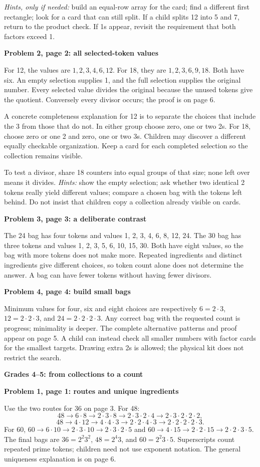 \documentclass[11pt]{article}
\newcommand{\head}[1]{\par\textbf{\large #1}\par}
\newcommand{\sub}[1]{\par\textbf{#1}\par}
\begin{document}
\emph{Hints, only if needed:} build an equal-row array for the card; find a different first rectangle; look for a card that can still split. If a child splits 12 into 5 and 7, return to the product check. If 1s appear, revisit the requirement that both factors exceed 1.

\sub{Problem 2, page 2: all selected-token values}
For 12, the values are $1,2,3,4,6,12$. For 18, they are $1,2,3,6,9,18$. Both have six. An empty selection supplies 1, and the full selection supplies the original number. Every selected value divides the original because the unused tokens give the quotient. Conversely every divisor occurs; the proof is on page 6.

A concrete completeness explanation for 12 is to separate the choices that include the 3 from those that do not. In either group choose zero, one or two 2s. For 18, choose zero or one 2 and zero, one or two 3s. Children may discover a different equally checkable organization. Keep a card for each completed selection so the collection remains visible.

To test a divisor, share 18 counters into equal groups of that size; none left over means it divides. \emph{Hints:} show the empty selection; ask whether two identical 2 tokens really yield different values; compare a chosen bag with the tokens left behind. Do not insist that children copy a collection already visible on cards.

\sub{Problem 3, page 3: a deliberate contrast}
The 24 bag has four tokens and values 1, 2, 3, 4, 6, 8, 12, 24. The 30 bag has three tokens and values 1, 2, 3, 5, 6, 10, 15, 30. Both have eight values, so the bag with more tokens does not make more. Repeated ingredients and distinct ingredients give different choices, so token count alone does not determine the answer. A bag can have fewer tokens without having fewer divisors.

\sub{Problem 4, page 4: build small bags}
Minimum values for four, six and eight choices are respectively $6=2\cdot3$, $12=2\cdot2\cdot3$, and $24=2\cdot2\cdot2\cdot3$. Any correct bag with the requested count is progress; minimality is deeper. The complete alternative patterns and proof appear on page 5. A child can instead check all smaller numbers with factor cards for the smallest targets. Drawing extra 2s is allowed; the physical kit does not restrict the search.
\newpage
\head{Grades 4--5: from collections to a count}
\sub{Problem 1, page 1: routes and unique ingredients}
Use the two routes for 36 on page 3. For 48:
\[
48\to6\cdot8\to2\cdot3\cdot8\to2\cdot3\cdot2\cdot4
\to2\cdot3\cdot2\cdot2\cdot2,
\]
\[
48\to4\cdot12\to4\cdot4\cdot3\to2\cdot2\cdot4\cdot3
\to2\cdot2\cdot2\cdot2\cdot3.
\]
For 60, $60\to6\cdot10\to2\cdot3\cdot10\to2\cdot3\cdot2\cdot5$ and $60\to4\cdot15\to2\cdot2\cdot15\to2\cdot2\cdot3\cdot5$. The final bags are $36=2^2 3^2$, $48=2^4 3$, and $60=2^2 3\cdot5$. Superscripts count repeated prime tokens; children need not use exponent notation. The general uniqueness explanation is on page 6.
\end{document}
